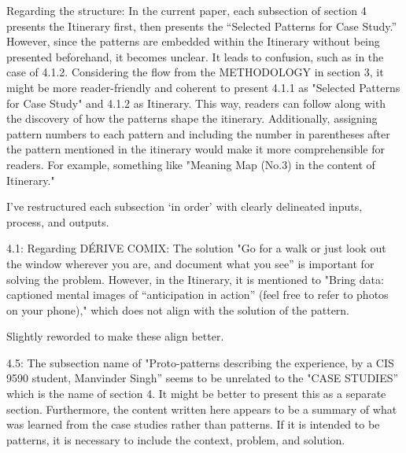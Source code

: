 \documentclass[acmlarge,timestamp]{acmart}
\begin{document}
\begin{leftbubbles}
Regarding the structure: In the current paper, each subsection of
section 4 presents the Itinerary first, then presents the “Selected
Patterns for Case Study.” However, since the patterns are embedded
within the Itinerary without being presented beforehand, it becomes
unclear. It leads to confusion, such as in the case of
4.1.2. Considering the flow from the METHODOLOGY in section 3, it
might be more reader-friendly and coherent to present 4.1.1 as
"Selected Patterns for Case Study" and 4.1.2 as Itinerary. This way,
readers can follow along with the discovery of how the patterns shape
the itinerary. Additionally, assigning pattern numbers to each pattern
and including the number in parentheses after the pattern mentioned in
the itinerary would make it more comprehensible for readers. For
example, something like "Meaning Map (No.3) in the content of
Itinerary."
\end{leftbubbles}

\begin{rightbubbles}
I’ve restructured each subsection ‘in order’ with clearly delineated
inputs, process, and outputs.  {\large {}}
\end{rightbubbles}

\begin{leftbubbles}
4.1: Regarding DÉRIVE COMIX: The solution "Go for a walk or just look
out the window wherever you are, and document what you see” is
important for solving the problem. However, in the Itinerary, it is
mentioned to "Bring data: captioned mental images of “anticipation in
action” (feel free to refer to photos on your phone)," which does not
align with the solution of the pattern.
\end{leftbubbles}

\begin{rightbubbles}
Slightly reworded to make these align better. {\large {}}
\end{rightbubbles}

\begin{leftbubbles}
4.5: The subsection name of "Proto-patterns describing the experience,
by a CIS 9590 student, Manvinder Singh” seems to be unrelated to the
"CASE STUDIES” which is the name of section 4. It might be better to
present this as a separate section. Furthermore, the content written
here appears to be a summary of what was learned from the case studies
rather than patterns. If it is intended to be patterns, it is
necessary to include the context, problem, and solution.
\end{leftbubbles}
\end{document}
